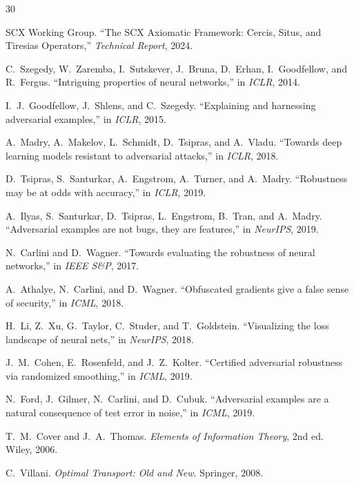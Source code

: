 \documentclass[12pt,a4paper]{article}
\begin{document}

\begin{thebibliography}{30}

SCX Working Group.
\newblock ``The SCX Axiomatic Framework: Cercis, Situs, and Tiresias
Operators,''
\newblock \emph{Technical Report}, 2024.

C.~Szegedy, W.~Zaremba, I.~Sutskever, J.~Bruna, D.~Erhan, I.~Goodfellow,
and R.~Fergus.
\newblock ``Intriguing properties of neural networks,''
\newblock in \emph{ICLR}, 2014.

I.~J.~Goodfellow, J.~Shlens, and C.~Szegedy.
\newblock ``Explaining and harnessing adversarial examples,''
\newblock in \emph{ICLR}, 2015.

A.~Madry, A.~Makelov, L.~Schmidt, D.~Tsipras, and A.~Vladu.
\newblock ``Towards deep learning models resistant to adversarial attacks,''
\newblock in \emph{ICLR}, 2018.

D.~Tsipras, S.~Santurkar, A.~Engstrom, A.~Turner, and A.~Madry.
\newblock ``Robustness may be at odds with accuracy,''
\newblock in \emph{ICLR}, 2019.

A.~Ilyas, S.~Santurkar, D.~Tsipras, L.~Engstrom, B.~Tran, and A.~Madry.
\newblock ``Adversarial examples are not bugs, they are features,''
\newblock in \emph{NeurIPS}, 2019.

N.~Carlini and D.~Wagner.
\newblock ``Towards evaluating the robustness of neural networks,''
\newblock in \emph{IEEE S\&P}, 2017.

A.~Athalye, N.~Carlini, and D.~Wagner.
\newblock ``Obfuscated gradients give a false sense of security,''
\newblock in \emph{ICML}, 2018.

H.~Li, Z.~Xu, G.~Taylor, C.~Studer, and T.~Goldstein.
\newblock ``Visualizing the loss landscape of neural nets,''
\newblock in \emph{NeurIPS}, 2018.

J.~M.~Cohen, E.~Rosenfeld, and J.~Z.~Kolter.
\newblock ``Certified adversarial robustness via randomized smoothing,''
\newblock in \emph{ICML}, 2019.

N.~Ford, J.~Gilmer, N.~Carlini, and D.~Cubuk.
\newblock ``Adversarial examples are a natural consequence of test error in
noise,''
\newblock in \emph{ICML}, 2019.

T.~M.~Cover and J.~A.~Thomas.
\newblock \emph{Elements of Information Theory}, 2nd ed.
\newblock Wiley, 2006.

C.~Villani.
\newblock \emph{Optimal Transport: Old and New}.
\newblock Springer, 2008.

\end{thebibliography}
\end{document}
